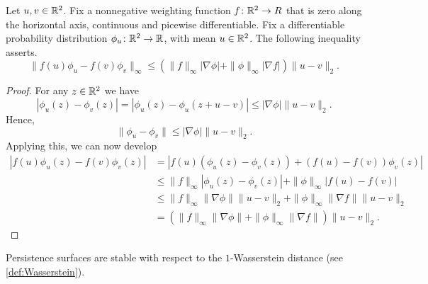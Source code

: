 \begin{lemma} \label{lemma:images-aux}
    Let $ u, v \in \mathbb R^2 $. Fix a nonnegative weighting function $ f \colon \mathbb R^2 \to R $ that is zero along the horizontal axis, continuous and picewise differentiable. Fix a differentiable probability distribution $ \phi_u \colon \mathbb R^2 \to \mathbb R $, with mean $ u \in \mathbb R^2 $. The following inequality asserts.
    \begin{equation}
        \|f(u) \phi_u - f(v)\phi_v \|_\infty \leq (\|f\|_\infty |\nabla \phi| + \|\phi\|_\infty |\nabla f |) \| u - v \|_2.
    \end{equation}
\end{lemma}
\begin{proof}
    For any $ z \in \mathbb R^2 $ we have
    \begin{equation}
        | \phi_u(z) - \phi_v(z) | = | \phi_u(z) - \phi_u(z + u - v) | \leq |\nabla \phi | \|u - v \|_2.
    \end{equation}
    Hence,
    \begin{equation}
        \| \phi_u - \phi_v \| \leq |\nabla \phi | \|u - v \|_2.
    \end{equation}
    Applying this, we can now develop    
    \begin{align}
        |f(u)\phi_u(z) - f(v)\phi_v(z)| &= |f(u)(\phi_u(z) - \phi_v(z)) + (f(u) - f(v))\phi_v(z)| \\
        &\leq \|f\|_\infty |\phi_u(z) - \phi_v(z)| + \|\phi\|_\infty |f(u) - f(v)| \\
        &\leq \|f\|_\infty \|\nabla \phi\| \|u - v\|_2 + \|\phi\|_\infty \|\nabla f\| \|u - v\|_2 \\
        &= (\|f\|_\infty \|\nabla \phi\| + \|\phi\|_\infty \|\nabla f\|)\|u - v\|_2.
    \end{align}
\end{proof}

Persistence surfaces are stable with respect to the $1$-Wasserstein distance (see \ref{def:Wasserstein}).

